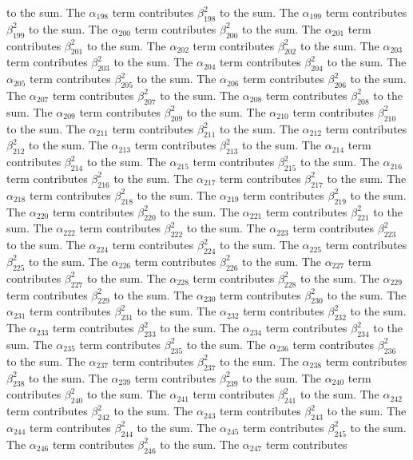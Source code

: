 \begin{lemma}
to the sum. The $\alpha_{198}$ term contributes $\beta_{198}^{2}$ to the sum. The $\alpha_{199}$ term contributes $\beta_{199}^{2}$ to the sum. The $\alpha_{200}$ term contributes $\beta_{200}^{2}$ to the sum. The $\alpha_{201}$ term contributes $\beta_{201}^{2}$ to the sum. The $\alpha_{202}$ term contributes $\beta_{202}^{2}$ to the sum. The $\alpha_{203}$ term contributes $\beta_{203}^{2}$ to the sum. The $\alpha_{204}$ term contributes $\beta_{204}^{2}$ to the sum. The $\alpha_{205}$ term contributes $\beta_{205}^{2}$ to the sum. The $\alpha_{206}$ term contributes $\beta_{206}^{2}$ to the sum. The $\alpha_{207}$ term contributes $\beta_{207}^{2}$ to the sum. The $\alpha_{208}$ term contributes $\beta_{208}^{2}$ to the sum. The $\alpha_{209}$ term contributes $\beta_{209}^{2}$ to the sum. The $\alpha_{210}$ term contributes $\beta_{210}^{2}$ to the sum. The $\alpha_{211}$ term contributes $\beta_{211}^{2}$ to the sum. The $\alpha_{212}$ term contributes $\beta_{212}^{2}$ to the sum. The $\alpha_{213}$ term contributes $\beta_{213}^{2}$ to the sum. The $\alpha_{214}$ term contributes $\beta_{214}^{2}$ to the sum. The $\alpha_{215}$ term contributes $\beta_{215}^{2}$ to the sum. The $\alpha_{216}$ term contributes $\beta_{216}^{2}$ to the sum. The $\alpha_{217}$ term contributes $\beta_{217}^{2}$ to the sum. The $\alpha_{218}$ term contributes $\beta_{218}^{2}$ to the sum. The $\alpha_{219}$ term contributes $\beta_{219}^{2}$ to the sum. The $\alpha_{220}$ term contributes $\beta_{220}^{2}$ to the sum. The $\alpha_{221}$ term contributes $\beta_{221}^{2}$ to the sum. The $\alpha_{222}$ term contributes $\beta_{222}^{2}$ to the sum. The $\alpha_{223}$ term contributes $\beta_{223}^{2}$ to the sum. The $\alpha_{224}$ term contributes $\beta_{224}^{2}$ to the sum. The $\alpha_{225}$ term contributes $\beta_{225}^{2}$ to the sum. The $\alpha_{226}$ term contributes $\beta_{226}^{2}$ to the sum. The $\alpha_{227}$ term contributes $\beta_{227}^{2}$ to the sum. The $\alpha_{228}$ term contributes $\beta_{228}^{2}$ to the sum. The $\alpha_{229}$ term contributes $\beta_{229}^{2}$ to the sum. The $\alpha_{230}$ term contributes $\beta_{230}^{2}$ to the sum. The $\alpha_{231}$ term contributes $\beta_{231}^{2}$ to the sum. The $\alpha_{232}$ term contributes $\beta_{232}^{2}$ to the sum. The $\alpha_{233}$ term contributes $\beta_{233}^{2}$ to the sum. The $\alpha_{234}$ term contributes $\beta_{234}^{2}$ to the sum. The $\alpha_{235}$ term contributes $\beta_{235}^{2}$ to the sum. The $\alpha_{236}$ term contributes $\beta_{236}^{2}$ to the sum. The $\alpha_{237}$ term contributes $\beta_{237}^{2}$ to the sum. The $\alpha_{238}$ term contributes $\beta_{238}^{2}$ to the sum. The $\alpha_{239}$ term contributes $\beta_{239}^{2}$ to the sum. The $\alpha_{240}$ term contributes $\beta_{240}^{2}$ to the sum. The $\alpha_{241}$ term contributes $\beta_{241}^{2}$ to the sum. The $\alpha_{242}$ term contributes $\beta_{242}^{2}$ to the sum. The $\alpha_{243}$ term contributes $\beta_{243}^{2}$ to the sum. The $\alpha_{244}$ term contributes $\beta_{244}^{2}$ to the sum. The $\alpha_{245}$ term contributes $\beta_{245}^{2}$ to the sum. The $\alpha_{246}$ term contributes $\beta_{246}^{2}$ to the sum. The $\alpha_{247}$ term contributes 
\end{lemma}
